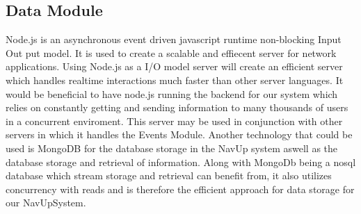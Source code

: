 \documentclass[11pt]{article}
\begin{document}
\subsection{Data Module}
Node.js is an asynchronous event driven javascript runtime non-blocking Input Out put model. It is used to create a scalable and effiecent server for network applications. Using Node.js as a I/O model server will create an efficient server which handles realtime interactions much faster than other server languages. It would be beneficial to have node.js running the backend for our system which relies on constantly getting and sending information to many thousands of users in a concurrent enviroment. This server may be used in conjunction with other servers in which it handles the Events Module. Another technology that could be used is MongoDB for the database storage in the NavUp system aswell as the database storage and retrieval of information. Along with MongoDb being a nosql database which stream storage and retrieval can benefit from, it also utilizes concurrency with reads and is therefore the efficient approach for data storage for our NavUpSystem.
\end{document}
